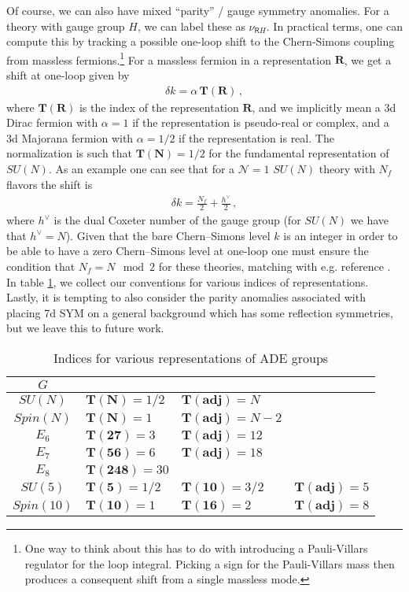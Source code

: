 \documentclass[12pt]{article}%
\numberwithin{equation}{section}
\newcommand{\al}[1]{\begin{align}#1\end{align}}
\renewcommand{\(}{\left(}
\renewcommand{\)}{\right)}
\renewcommand{\[}{\left[}
\renewcommand{\]}{\right]}
\begin{document}
Of course, we can also have mixed ``parity'' / gauge symmetry anomalies. For a theory with gauge group $H$, we can label these as $\nu_{\mathsf{R} H}$. In practical terms, one can compute this by tracking a possible one-loop shift to the Chern-Simons coupling from massless fermions.\footnote{One way to think about this has to do with introducing a Pauli-Villars regulator for
the loop integral. Picking a sign for the Pauli-Villars mass then produces a consequent shift from a single massless mode.}
For a massless fermion in a representation $\mathbf{R}$, we get a shift at one-loop given by
%
\al{ \delta k =  \alpha\, \mathbf{T}(\mathbf{R})\,,
}
%
where $\mathbf{T}(\mathbf{R})$ is the index of the representation $\mathbf{R}$, and we implicitly mean a 3d Dirac fermion with $\alpha=1$ if the representation is pseudo-real or complex, and a 3d Majorana fermion with $\alpha= 1/2 $ if the representation is real. The normalization is such that $\mathbf{T}(\mathbf{N})= 1/2 $ for the fundamental representation of $SU(N)$. As an example one can see that for a $\mathcal N=1$ $SU(N)$ theory with $N_f$ flavors the shift is
%
\al{\delta k = \frac{N_f}{2} + \frac{h^\lor}{2}\,,
}
%
where $h^\lor$ is the dual Coxeter number of the gauge group (for $SU(N)$ we have that $h^\lor = N$). Given that the bare Chern--Simons level $k$ is an integer in order to be able to have a zero Chern--Simons level at one-loop one must ensure the condition that $N_f = N \mod 2$ for these theories, matching with e.g. reference \cite{Gaiotto:2018yjh}. In table \ref{tab:group}, we collect our conventions for various indices of representations. Lastly, it is tempting to also consider the parity anomalies associated with placing 7d SYM on a general background which has some reflection symmetries, but we leave this to future work.

\begin{table}[!t]
\centering
\begin{tabular}{c|l|l|l}
$G$ &  &   &\\
\hline
\hline
$SU(N)$ & $\mathbf{T}(\mathbf{N}) = 1/2$ & $\mathbf{T}(\mathbf{adj}) = N$\\
\hline
$Spin(N)$ & $\mathbf{T}(\mathbf{N}) = 1$ & $\mathbf{T}(\mathbf{adj}) = N-2$\\
\hline
$E_6$ & $\mathbf{T}(\mathbf{27}) = 3$ & $\mathbf{T}(\mathbf{adj}) = 12$\\
\hline
$E_7$ & $\mathbf{T}(\mathbf{56}) = 6$ & $\mathbf{T}(\mathbf{adj}) = 18$\\
\hline
$E_8$ & $\mathbf{T}(\mathbf{248}) = 30$\\
\hline
\hline
$SU(5)$ & $\mathbf{T}(\mathbf{5}) = 1/2$ & $\mathbf{T}(\mathbf{10}) = 3/2$ &$\mathbf{T}(\mathbf{adj}) = 5$\\
\hline
$Spin(10)$ & $\mathbf{T}(\mathbf{10}) = 1$ & $\mathbf{T}(\mathbf{16}) = 2$ &$\mathbf{T}(\mathbf{adj}) = 8$\\
\hline
\end{tabular}
\caption{Indices for various representations of ADE groups}
\label{tab:group}
\end{table}
\end{document}
